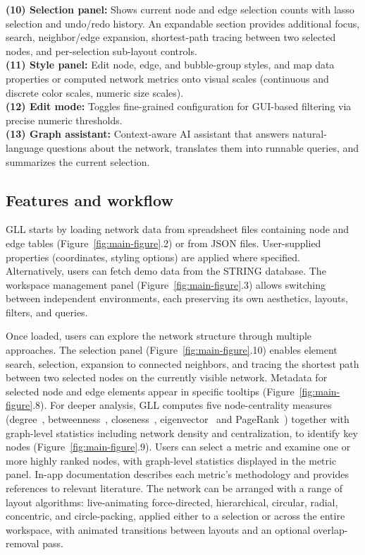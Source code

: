 \textbf{(10) Selection panel:} Shows current node and edge selection counts with lasso selection and undo/redo history. An expandable section provides additional focus, search, neighbor/edge expansion, shortest-path tracing between two selected nodes, and per-selection sub-layout controls. \\
\textbf{(11) Style panel:} Edit node, edge, and bubble-group styles, and map data properties or computed network metrics onto visual scales (continuous and discrete color scales, numeric size scales). \\
\textbf{(12) Edit mode:} Toggles fine-grained configuration for GUI-based filtering via precise numeric thresholds. \\
\textbf{(13) Graph assistant:} Context-aware AI assistant that answers natural-language questions about the network, translates them into runnable queries, and summarizes the current selection. \\

\subsection{Features and workflow}
GLL starts by loading network data from spreadsheet files containing node and edge tables (Figure~\ref{fig:main-figure}.2) or from JSON files. User-supplied properties (coordinates, styling options) are applied where specified. Alternatively, users can fetch demo data from the STRING database. The workspace management panel (Figure~\ref{fig:main-figure}.3) allows switching between independent environments, each preserving its own aesthetics, layouts, filters, and queries.

Once loaded, users can explore the network structure through multiple approaches. The selection panel (Figure~\ref{fig:main-figure}.10) enables element search, selection, expansion to connected neighbors, and tracing the shortest path between two selected nodes on the currently visible network. Metadata for selected node and edge elements appear in specific tooltips (Figure~\ref{fig:main-figure}.8). For deeper analysis, GLL computes five node-centrality measures (degree~\citep{freemanSetMeasuresCentrality1977a}, betweenness~\citep{freemanSetMeasuresCentrality1977a}, closeness~\citep{bavelasCommunicationPatternsTaskOriented1950a}, eigenvector~\citep{newmanMathematicsNetworks2018a} and PageRank~\citep{ brinAnatomyLargescaleHypertextual1998a}) together with graph-level statistics including network density and centralization, to identify key nodes (Figure~\ref{fig:main-figure}.9). Users can select a metric and examine one or more highly ranked nodes, with graph-level statistics displayed in the metric panel. In-app documentation describes each metric's methodology and provides references to relevant literature. The network can be arranged with a range of layout algorithms: live-animating force-directed, hierarchical, circular, radial, concentric, and circle-packing, applied either to a selection or across the entire workspace, with animated transitions between layouts and an optional overlap-removal pass.

